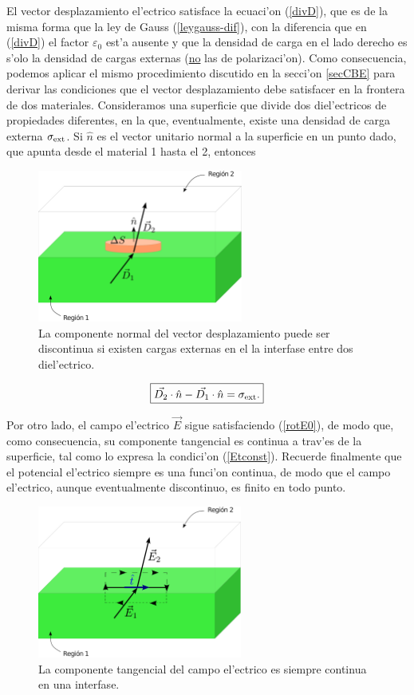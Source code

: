 El vector desplazamiento el'ectrico satisface la ecuaci'on (\ref{divD}), que es
de la misma forma que la ley de Gauss (\ref{leygauss-dif}), con la diferencia
que en (\ref{divD}) el factor $\varepsilon_0$ est'a ausente y que la densidad de carga en el lado derecho es s'olo la densidad de cargas externas (\underline{no} las de polarizaci'on). Como consecuencia, podemos aplicar el mismo procedimiento discutido en la secci'on \ref{secCBE} para derivar las condiciones que el vector desplazamiento debe satisfacer en la frontera de dos materiales. Consideramos una superficie que divide dos diel'ectricos de propiedades diferentes, en la que, eventualmente, existe una densidad de carga externa $\sigma_{\rm ext}$. Si $\hat{n}$ es el vector unitario normal a la superficie en un punto dado, que apunta desde el material 1 hasta el 2, entonces
\begin{figure}[!h]
\centerline{\includegraphics[height=5cm]{fig/fig-dielectrico-condicion-borde-01.pdf}}
\caption{La componente normal del vector desplazamiento puede ser discontinua
si existen cargas externas en el la interfase entre dos diel'ectrico.}
\label{CF1}
\end{figure}
\begin{equation}\label{saltoDn}
\boxed{\vec{D_2}\cdot\hat{n}-\vec{D_1}\cdot\hat{n}=\sigma_{\rm
ext}.}
\end{equation}

Por otro lado, el campo el'ectrico $\vec{E}$ sigue satisfaciendo (\ref{rotE0}),
de modo que, como consecuencia, su componente tangencial es continua a trav'es
de la superficie, tal como lo expresa la condici'on (\ref{Etconst}). Recuerde
finalmente que el potencial el'ectrico siempre es una funci'on continua, de
modo que el campo el'ectrico, aunque eventualmente discontinuo, es finito en
todo punto.
\begin{figure}[!h]
\centerline{\includegraphics[height=5cm]{fig/fig-dielectrico-condicion-borde-02.pdf}}
\caption{La componente tangencial del campo el'ectrico es siempre continua
en una interfase.}
\label{CF2}
\end{figure}

